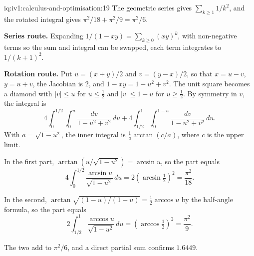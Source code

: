 \begin{solution}{iq:iv1:calculus-and-optimisation:19}
The geometric series gives $\sum_{k \ge 1} 1/k^2$, and the rotated integral gives $\pi^2/18 + \pi^2/9 = \pi^2/6$.

\textbf{Series route.} Expanding $1/(1 - xy) = \sum_{k \ge 0}(xy)^k$, with non-negative terms so the sum and integral can be swapped, each term integrates to $1/(k + 1)^2$.

\textbf{Rotation route.} Put $u = (x + y)/2$ and $v = (y - x)/2$, so that $x = u - v$, $y = u + v$, the Jacobian is 2, and $1 - xy = 1 - u^2 + v^2$. The unit square becomes a diamond with $|v| \le u$ for $u \le \frac12$ and $|v| \le 1 - u$ for $u \ge \frac12$. By symmetry in $v$, the integral is
\[
4\int_0^{1/2}\!\!\int_0^u \frac{dv}{1 - u^2 + v^2}\,du + 4\int_{1/2}^1\!\!\int_0^{1 - u}\frac{dv}{1 - u^2 + v^2}\,du.
\]
With $a = \sqrt{1 - u^2}$, the inner integral is $\frac1a\arctan(c/a)$, where $c$ is the upper limit.

In the first part, $\arctan(u/\sqrt{1 - u^2}) = \arcsin u$, so the part equals
\[
4\int_0^{1/2}\frac{\arcsin u}{\sqrt{1 - u^2}}\,du = 2\left(\arcsin\tfrac12\right)^2 = \frac{\pi^2}{18}.
\]

In the second, $\arctan\sqrt{(1 - u)/(1 + u)} = \frac12\arccos u$ by the half-angle formula, so the part equals
\[
2\int_{1/2}^1\frac{\arccos u}{\sqrt{1 - u^2}}\,du = \left(\arccos\tfrac12\right)^2 = \frac{\pi^2}{9}.
\]

The two add to $\pi^2/6$, and a direct partial sum confirms $1.6449$.



\end{solution}

